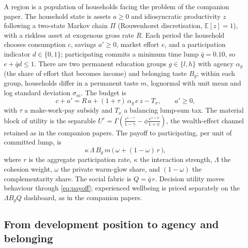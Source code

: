 \documentclass[11pt]{article}
\begin{document}
A region is a population of households facing the problem of the companion
paper. The household state is assets $a \ge 0$ and idiosyncratic
productivity $z$ following a two-state Markov chain $\Pi$ (Rouwenhorst
discretisation, $\mathbb{E}[z]=1$), with a riskless asset at exogenous gross
rate $R$. Each period the household chooses consumption $c$, savings
$a' \ge 0$, market effort $e$, and a participation indicator
$d \in \{0,1\}$; participating commits a minimum time lump
$\bar q = 0.10$, so $e + \bar q d \le 1$. There are two permanent education
groups $g \in \{l,h\}$ with agency $\alpha_g$ (the share of effort that
becomes income) and belonging taste $B_g$; within each group, households
differ in a permanent taste $m$, lognormal with unit mean and log standard
deviation $\sigma_m$. The budget is
\begin{equation}
c + a' = R\,a + (1+\tau)\,\alpha_g\, e\, z - T_x, \qquad a' \ge 0,
\end{equation}
with $\tau$ a make-work-pay subsidy and $T_x$ a balancing lump-sum tax. The
material block of utility is the separable
$U^c = \Gamma\!\left(\tfrac{c^{1-\gamma}}{1-\gamma} - \phi\tfrac{e^{1+\psi}}{1+\psi}\right)$,
the wealth-effect channel retained as in the companion papers. The payoff
to participating, per unit of committed lump, is
\begin{equation}
\kappa\,\Lambda\,B_g\,m\,\bigl(\,\omega + (1-\omega)\,r\,\bigr),
\label{eq:payoff}
\end{equation}
where $r$ is the aggregate participation rate, $\kappa$ the interaction
strength, $\Lambda$ the cohesion weight, $\omega$ the private warm-glow
share, and $(1-\omega)$ the complementarity share. The social fabric is
$Q = \bar q\, r$. Decision utility moves behaviour through
\eqref{eq:payoff}; experienced wellbeing is priced separately on the
$\Lambda B_g Q$ dashboard, as in the companion papers.

\subsection{From development position to agency and belonging}
\end{document}
